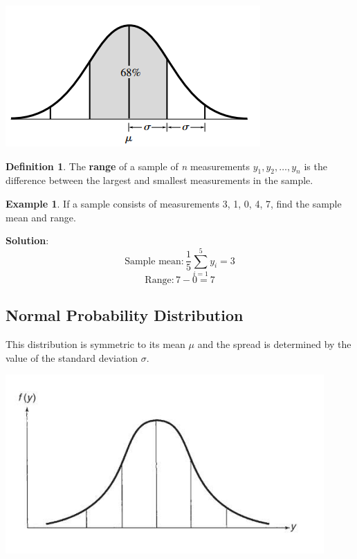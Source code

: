 \documentclass[12pt]{book}
\theoremstyle{definition}
\newtheorem{exmp}{Example}[section]
\newtheorem{definition}{Definition}[section]
\begin{document}
\begin{center}
    \includegraphics[scale=0.9]{./assets/bell-shape.png}
\end{center}

\begin{definition}
    The \textbf{range} of a sample of \textit{n} measurements $y_1, y_2, \dots, y_n$ is the difference between the largest and smallest measurements in the sample.
\end{definition}

\begin{exmp}
    If a sample consists of measurements 3, 1, 0, 4, 7, find the sample mean and range.

    \textbf{Solution}: 
    \[
        \text{Sample mean}: \frac{1}{5} \sum_{i = 1}^{5} y_i = 3
    \]
    \[
        \text{Range}: 7 - 0 = 7
    \]
\end{exmp}

\subsection{Normal Probability Distribution}
This distribution is symmetric to its mean $\mu$ and the spread is determined by the value of the standard deviation $\sigma$.
\begin{center}
    \includegraphics[scale=0.8]{./assets/normal-distrib.png}
\end{center}
\end{document}
